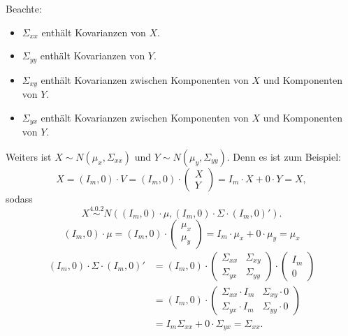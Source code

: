 \documentclass[10pt]{article}
\begin{document}
			Beachte:
			\begin{itemize}
				\item $\Sigma_{xx}$ enthält Kovarianzen von $X$.
				\item $\Sigma_{yy}$ enthält Kovarianzen von $Y$.
				\item $\Sigma_{xy}$ enthält Kovarianzen zwischen Komponenten von $X$ und Komponenten von $Y$.
				\item $\Sigma_{yx}$ enthält Kovarianzen zwischen Komponenten von $X$ und Komponenten von $Y$.
			\end{itemize}
			Weiters ist $X \sim N(\mu_x, \Sigma_{xx})$ und $Y \sim N(\mu_y, \Sigma_{yy})$. Denn es ist zum Beispiel:
			\begin{equation*}
				X = (I_m, 0) \cdot V = (I_m,0) \cdot \left(
				\begin{array}{c}
					X\\
					Y
				\end{array}
				\right) = I_m \cdot X + 0 \cdot Y = X,
			\end{equation*}
			sodass
			\begin{equation*}
				X \overset{\text{4.0.2}}{\sim} N((I_m,0)\cdot \mu, (I_m,0) \cdot \Sigma \cdot (I_m,0)').
			\end{equation*}
			\begin{equation*}
				(I_m,0)\cdot \mu = (I_m,0) \cdot \left(
				\begin{array}{c}
					\mu_x\\
					\mu_y
				\end{array}
				\right) = I_m \cdot \mu_x + 0 \cdot \mu_y = \mu_x
			\end{equation*}
			\begin{equation*}
				\begin{split}
					(I_m,0) \cdot \Sigma \cdot (I_m,0)' &= (I_m, 0) \cdot  \begin{pmatrix}
						\Sigma_{xx} & \Sigma_{xy} \\ \Sigma_{yx} & \Sigma_{yy}
					\end{pmatrix} \cdot  \left(
					\begin{array}{c}
					I_m\\
					0
					\end{array}
					\right)\\
					&= (I_m, 0) \cdot \begin{pmatrix}
						\Sigma_{xx} \cdot I_m & \Sigma_{xy} \cdot 0 \\ \Sigma_{yx} \cdot I_m & \Sigma_{yy} \cdot 0
					\end{pmatrix}\\
					&= I_m \Sigma_{xx} + 0 \cdot \Sigma_{yx} = \Sigma_{xx}. 
				\end{split}
			\end{equation*}
\end{document}
